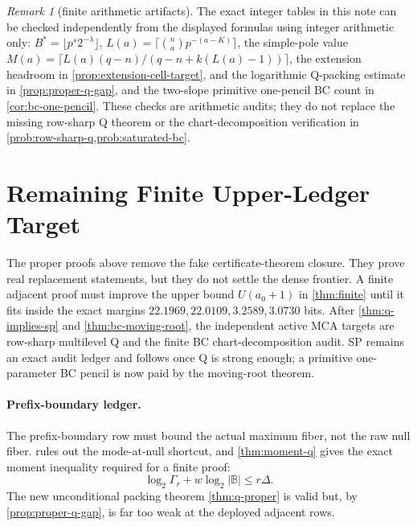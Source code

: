 \documentclass[a4paper,11pt]{amsart}
\theoremstyle{remark}
\newtheorem{remark}[remark]{Remark}
\newcommand{\B}{\mathbb B}
\begin{document}
\begin{remark}[finite arithmetic artifacts]\label{rem:finite-arithmetic-artifacts}
The exact integer tables in this note can be checked independently from the displayed formulas using integer arithmetic only: \(B^*=\lfloor p^s2^{-\lambda}\rfloor\), \(L(a)=\lceil\binom na p^{-(a-K)}\rceil\), the simple-pole value \(M(a)=\lceil L(a)(q-n)/(q-n+k(L(a)-1))\rceil\), the extension headroom in \cref{prop:extension-cell-target}, and the logarithmic Q-packing estimate in \cref{prop:proper-q-gap}, and the two-slope primitive one-pencil BC count in \cref{cor:bc-one-pencil}.  These checks are arithmetic audits; they do not replace the missing row-sharp Q theorem or the chart-decomposition verification in \cref{prob:row-sharp-q,prob:saturated-bc}.
\end{remark}

\section{Remaining Finite Upper-Ledger Target}

The proper proofs above remove the fake certificate-theorem closure.  They prove real replacement statements, but they do not settle the dense frontier.  A finite adjacent proof must improve the upper bound \(U(a_0+1)\) in \cref{thm:finite} until it fits inside the exact margins \(22.1969,22.0109,3.2589,3.0730\) bits.  After \cref{thm:q-implies-sp} and \cref{thm:bc-moving-root}, the independent active MCA targets are row-sharp multilevel Q and the finite BC chart-decomposition audit.  SP remains an exact audit ledger and follows once Q is strong enough; a primitive one-parameter BC pencil is now paid by the moving-root theorem.

\paragraph{Prefix-boundary ledger.}  The prefix-boundary row must bound the actual maximum fiber, not the raw null fiber.   rules out the mode-at-null shortcut, and \cref{thm:moment-q} gives the exact moment inequality required for a finite proof:
\[
        \log_2\Gamma_r+w\log_2|\B|\le r\Delta .
\]
The new unconditional packing theorem \cref{thm:q-proper} is valid but, by \cref{prop:proper-q-gap}, is far too weak at the deployed adjacent rows.
\end{document}

